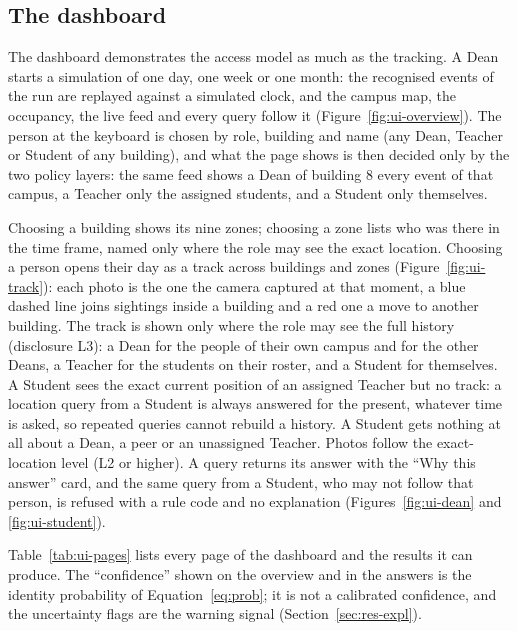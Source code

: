 \documentclass[12pt,a4paper,oneside]{report}
\begin{document}
\subsection{The dashboard}\label{sec:res-ui}
The dashboard demonstrates the access model as much as the tracking. A Dean starts a simulation of one day, one week or one month: the recognised events of the run are replayed against a simulated clock, and the campus map, the occupancy, the live feed and every query follow it (Figure~\ref{fig:ui-overview}). The person at the keyboard is chosen by role, building and name (any Dean, Teacher or Student of any building), and what the page shows is then decided only by the two policy layers: the same feed shows a Dean of building 8 every event of that campus, a Teacher only the assigned students, and a Student only themselves.

Choosing a building shows its nine zones; choosing a zone lists who was there in the time frame, named only where the role may see the exact location. Choosing a person opens their day as a track across buildings and zones (Figure~\ref{fig:ui-track}): each photo is the one the camera captured at that moment, a blue dashed line joins sightings inside a building and a red one a move to another building. The track is shown only where the role may see the full history (disclosure L3): a Dean for the people of their own campus and for the other Deans, a Teacher for the students on their roster, and a Student for themselves. A Student sees the exact current position of an assigned Teacher but no track: a location query from a Student is always answered for the present, whatever time is asked, so repeated queries cannot rebuild a history. A Student gets nothing at all about a Dean, a peer or an unassigned Teacher. Photos follow the exact-location level (L2 or higher). A query returns its answer with the ``Why this answer'' card, and the same query from a Student, who may not follow that person, is refused with a rule code and no explanation (Figures~\ref{fig:ui-dean} and \ref{fig:ui-student}).

Table~\ref{tab:ui-pages} lists every page of the dashboard and the results it can produce. The ``confidence'' shown on the overview and in the answers is the identity probability of Equation~\ref{eq:prob}; it is not a calibrated confidence, and the uncertainty flags are the warning signal (Section~\ref{sec:res-expl}).
\end{document}
